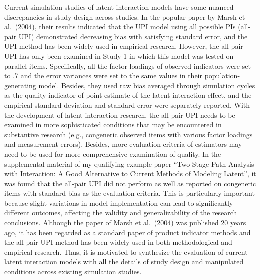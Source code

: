 \documentclass[
  man]{apa6}
\begin{document}
Current simulation studies of latent interaction models have some nuanced discrepancies in study design across studies. In the popular paper by Marsh et al.~(2004), their results indicated that the UPI model using all possible PIs (all-pair UPI) demonstrated decreasing bias with satisfying standard error, and the UPI method has been widely used in empirical research. However, the all-pair UPI has only been examined in Study 1 in which this model was tested on parallel items. Specifically, all the factor loadings of observed indicators were set to .7 and the error variances were set to the same values in their population-generating model. Besides, they used raw bias averaged through simulation cycles as the quality indicator of point estimate of the latent interaction effect, and the empirical standard deviation and standard error were separately reported. With the development of latent interaction research, the all-pair UPI needs to be examined in more sophisticated conditions that may be encountered in substantive research (e.g., congeneric observed items with various factor loadings and measurement errors). Besides, more evaluation criteria of estimators may need to be used for more comprehensive examination of quality. In the supplemental material of my qualifying example paper ``Two-Stage Path Analysis with Interaction: A Good Alternative to Current Methods of Modeling Latent'', it was found that the all-pair UPI did not perform as well as reported on congeneric items with standard bias as the evaluation criteria. This is particularly important because slight variations in model implementation can lead to significantly different outcomes, affecting the validity and generalizability of the research conclusions. Although the paper of Marsh et al.~(2004) was published 20 years ago, it has been regarded as a standard paper of product indicator methods and the all-pair UPI method has been widely used in both methodological and empirical research. Thus, it is motivated to synthesize the evaluation of current latent interaction models with all the details of study design and manipulated conditions across existing simulation studies.
\end{document}
